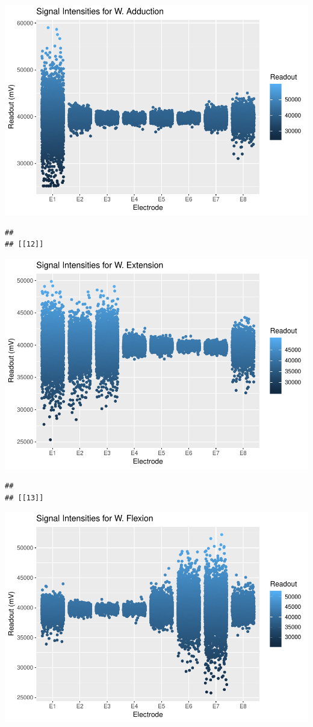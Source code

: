\documentclass[]{article}
\begin{document}
\includegraphics{Megahand_files/figure-latex/unnamed-chunk-5-11.pdf}

\begin{verbatim}
## 
## [[12]]
\end{verbatim}

\includegraphics{Megahand_files/figure-latex/unnamed-chunk-5-12.pdf}

\begin{verbatim}
## 
## [[13]]
\end{verbatim}

\includegraphics{Megahand_files/figure-latex/unnamed-chunk-5-13.pdf}
\end{document}
